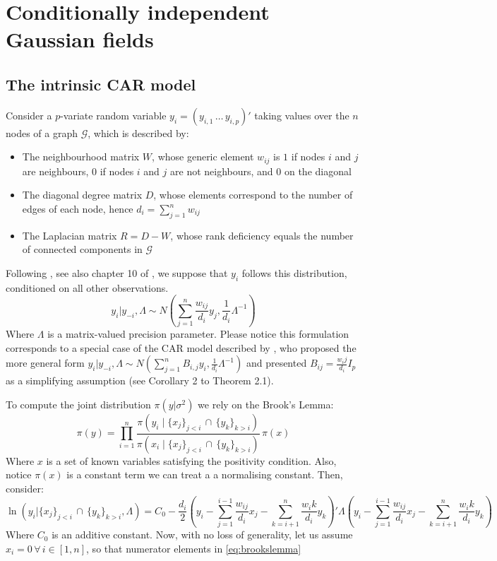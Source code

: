 \documentclass{article}
\begin{document}
 


\section{Conditionally independent Gaussian fields}



\subsection{The intrinsic CAR model}

Consider a $p$-variate random variable $y_i = (y_{i,1}   \, \ldots \, y_{i,p})'$ taking values over the $n$ nodes of a graph $\mathcal{G}$, which is described by:
\begin{itemize}
\item The neighbourhood matrix $W$, whose generic element $w_{ij}$ is $1$ if nodes $i$ and $j$ are neighbours, $0$ if nodes $i$ and $j$ are not neighbours, and $0$ on the diagonal
\item The diagonal degree matrix $D$, whose elements correspond to the number of edges of each node, hence $d_i = \sum_{j=1}^{n} w_{ij}$
\item The Laplacian matrix $R = D - W$, whose rank deficiency equals the number of connected components in $\mathcal{G}$
\end{itemize}

Following \cite{Mardia}, see also chapter 10 of \cite{Banerjee}, we suppose that $y_i$ follows this distribution, conditioned on all other observations. 
$$
y_i | y_{-i}, \Lambda \sim N \left(\sum_{j=1}^{n} \frac{w_{ij}}{d_i}y_{j}, \frac{1}{d_i} \Lambda^{-1}\right)
$$
Where $\Lambda$ is a matrix-valued precision parameter. Please notice this formulation corresponds to a special case of the CAR model described by \cite{Mardia}, who proposed the more general form $y_i | y_{-i}, \Lambda \sim N \left(\sum_{j=1}^{n} B_{i,j} y_{i}, \frac{1}{d_i} \Lambda^{-1}\right)$ and presented $B_{ij} = \frac{w_ij}{d_i} I_p$ as a simplifying assumption (see Corollary 2 to Theorem 2.1). 



To compute the joint distribution $\pi(y|\sigma^2)$ we rely on the Brook's Lemma:
 \begin{equation}
 \pi(y) = \prod_{i=1}^n \frac{
 \pi \left(y_i \mid \lbrace x_j \rbrace_{j<i} \, \cap \, \lbrace y_k \rbrace_{k>i}  \right)
 }{
 \pi \left(x_i \mid \lbrace x_j \rbrace_{j<i} \, \cap \, \lbrace y_k \rbrace_{k>i}  \right)
 } \, \pi(x)
 \label{eq:brookslemma}
 \end{equation}
Where $x$ is a set of known variables satisfying the positivity condition. Also, notice  $\pi(x)$ is a constant term we can treat a a normalising constant. Then, consider:
$$
\ln \left(y_i | \lbrace x_j \rbrace_{j<i} \, \cap \, \lbrace y_k \rbrace_{k>i}, \Lambda  \right) =
C_0 - \frac{d_i}{2} \left( 
y_i - \sum_{j=1}^{i-1} \frac{w_{ij}}{d_i} x_j  - \sum_{k=i+1}^{n} \frac{w_ik}{d_i}y_k
\right)' \Lambda \left( 
y_i - \sum_{j=1}^{i-1} \frac{w_{ij}}{d_i} x_j  - \sum_{k=i+1}^{n} \frac{w_ik}{d_i}y_k
\right)
$$ Where $C_0$ is an additive constant. Now, with no loss of generality, let us assume $x_i = 0 \,   \forall \, i \in [1,n]$, so that numerator elements in \ref{eq:brookslemma}
 
\end{document}
